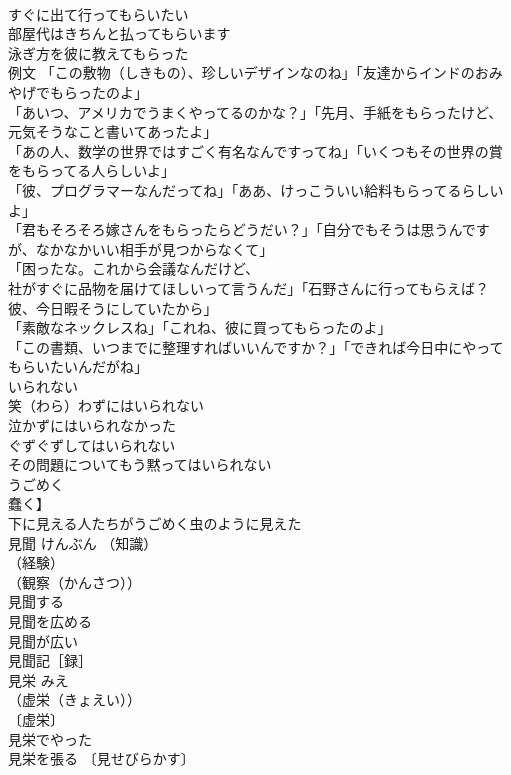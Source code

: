 \documentclass[8pt]{extreport}
\begin{document}
\begin{CJK}{UTF8}{min}
\\	すぐに出て行ってもらいたい 
\\	部屋代はきちんと払ってもらいます 
\\	泳ぎ方を彼に教えてもらった 
\\	例文 「この敷物（しきもの）、珍しいデザインなのね」「友達からインドのおみやげでもらったのよ」 
\\	「あいつ、アメリカでうまくやってるのかな？」「先月、手紙をもらったけど、元気そうなこと書いてあったよ」 
\\	「あの人、数学の世界ではすごく有名なんですってね」「いくつもその世界の賞をもらってる人らしいよ」 
\\	「彼、プログラマーなんだってね」「ああ、けっこういい給料もらってるらしいよ」 
\\	「君もそろそろ嫁さんをもらったらどうだい？」「自分でもそうは思うんですが、なかなかいい相手が見つからなくて」 
\\	「困ったな。これから会議なんだけど、
\\	社がすぐに品物を届けてほしいって言うんだ」「石野さんに行ってもらえば？　彼、今日暇そうにしていたから」 
\\	「素敵なネックレスね」「これね、彼に買ってもらったのよ」 
\\	「この書類、いつまでに整理すればいいんですか？」「できれば今日中にやってもらいたいんだがね」 
\\	いられない	
\\	笑（わら）わずにはいられない 
\\	泣かずにはいられなかった 
\\	ぐずぐずしてはいられない 
\\	その問題についてもう黙ってはいられない 
\\	うごめく	
\\	蠢く】	
\\	下に見える人たちがうごめく虫のように見えた 
\\	見聞	けんぶん	（知識）
\\	（経験）
\\	（観察（かんさつ））
\\	見聞する 
\\	見聞を広める 
\\	見聞が広い 
\\	見聞記［録］ 
\\	見栄	みえ	
\\	（虚栄（きょえい））
\\	〔虚栄〕
\\	見栄でやった 
\\	見栄を張る 〔見せびらかす〕

\end{CJK}
\end{document}
